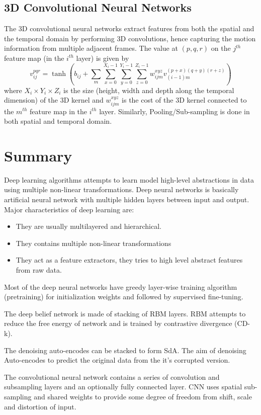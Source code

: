 \subsection{3D Convolutional Neural Networks}
The 3D convolutional neural networks extract features from both the spatial and the temporal domain by performing 3D convolutions, hence capturing the motion information from multiple adjacent frames.\cite{ji20133d} The value at $(p, q, r)$ on the $j^{th}$ feature map (in the $i^{th}$ layer) is given by
$$v^{pqr}_{ij} = \tanh(b_{ij}+\sum_{m} \sum_{x=0}^{X_i-1} \sum_{y=0}^{Y_i-1} \sum_{z=0}^{Z_i-1} w^{xyz}_{ijm} v^{(p+x)(q+y)(r+z)}_{(i−1)m}) $$
where $X_i \times Y_i \times Z_i$ is the size (height, width and depth  along the temporal dimension) of the 3D kernel and $w^{xyz}_{ijm}$ is the cost of the 3D kernel connected to the $m^{th}$ feature map in the $i^{th}$ layer. Similarly, Pooling/Sub-sampling is done in both spatial and temporal domain.

\section{Summary}
Deep learning algorithms attempts to learn model high-level abstractions in data using multiple non-linear transformations. Deep neural networks is basically artificial neural network with multiple hidden layers between input and output. Major characteristics of deep learning are:
\begin{itemize}
\item They are usually multilayered and hierarchical.
\item They contains multiple non-linear transformations 
\item They act as a feature extractors, they tries to high level abstract features from raw data.
\end{itemize}

Most of the deep neural networks have greedy layer-wise training algorithm (pretraining) for initialization weights and followed by supervised fine-tuning.
 
The deep belief network is made of stacking of RBM layers. RBM attempts to reduce the free energy of network and is trained by contrastive divergence (CD-k).

The denoising auto-encodes can be stacked to form SdA. The aim of denoising Auto-encodes to predict the original data from the it's corrupted version.

The convolutional neural network contains a series of convolution and subsampling layers and an optionally fully connected layer. CNN uses spatial sub-sampling and shared weights to provide some degree of freedom from shift, scale and distortion of input.
